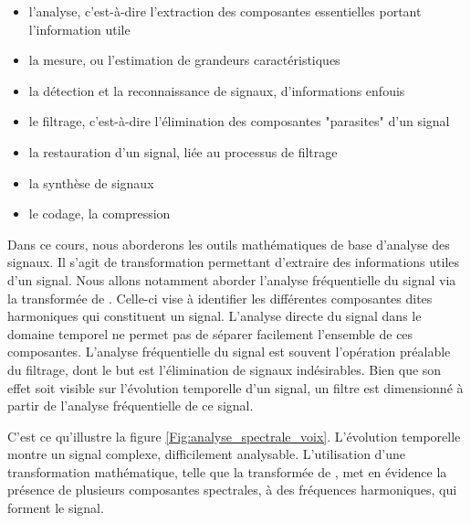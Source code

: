 	\begin{itemize}
		\item l'analyse, c'est-à-dire l'extraction des composantes essentielles portant l'information utile
		\item la mesure, ou l'estimation de grandeurs caractéristiques
		\item la détection et la reconnaissance de signaux, d'informations enfouis
		\item le filtrage, c'est-à-dire l'élimination des composantes "parasites" d'un signal
		\item la restauration d'un signal, liée au processus de filtrage
		\item la synthèse de signaux
		\item le codage, la compression
	\end{itemize}
	
	
	
	Dans ce cours, nous aborderons les outils mathématiques de base d'analyse des signaux. Il s'agit de transformation permettant d'extraire des informations utiles d'un signal. Nous allons notamment aborder l'analyse fréquentielle du signal via la transformée de \Fourier{}. Celle-ci vise à identifier les différentes composantes dites harmoniques qui constituent un signal. L'analyse directe du signal dans le domaine temporel ne permet pas de séparer facilement l'ensemble de ces composantes. L'analyse fréquentielle du signal est souvent l'opération préalable du filtrage, dont le but est l'élimination de signaux indésirables. Bien que son effet soit visible sur l'évolution temporelle d'un signal, un filtre est dimensionné à partir de l'analyse fréquentielle de ce signal.
	
	C'est ce qu'illustre la figure \ref{Fig:analyse_spectrale_voix}. L'évolution temporelle montre un signal complexe, difficilement analysable. L'utilisation d'une transformation mathématique, telle que la transformée de \Fourier{}, met en évidence la présence de plusieurs composantes spectrales, à des fréquences harmoniques, qui forment le signal.
	
